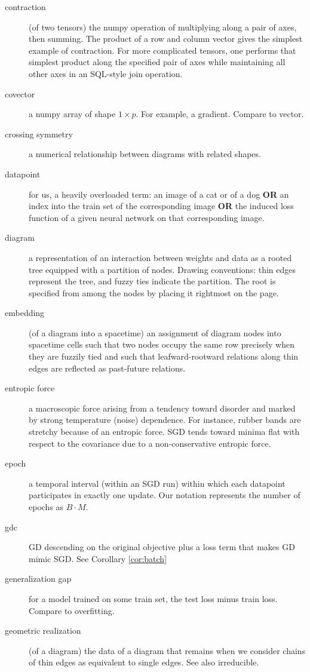 \documentclass{article}
\theoremstyle{plain}
\theoremstyle{definition}
\begin{document}
\begin{description}
        \item[contraction] (of two tensors) the numpy operation of multiplying along a pair of axes, then summing.  The product of a row and column vector gives the simplest example of contraction.  For more complicated tensors, one performs that simplest product along the specified pair of axes while maintaining all other axes in an SQL-style join operation.  
        \item[covector] a numpy array of shape $1\times p$.  For example, a gradient.  Compare to vector.
        \item[crossing symmetry] a numerical relationship between diagrams with related shapes. 
        \item[datapoint] for us, a heavily overloaded term: an image of a cat or of a dog {\bf OR} an index into the train set of the corresponding image {\bf OR} the induced loss function of a given neural network on that corresponding image.  
        \item[diagram] a representation of an interaction between weights and data as a rooted tree equipped with a partition of nodes.  Drawing conventions: thin edges represent the tree, and fuzzy ties indicate the partition.  The root is specified from among the nodes by placing it rightmost on the page.
        \item[embedding] (of a diagram into a spacetime) an assignment of diagram nodes into spacetime cells such that two nodes occupy the same row precisely when they are fuzzily tied and such that leafward-rootward relations along thin edges are reflected as past-future relations.
        \item[entropic force] a macroscopic force arising from a tendency toward disorder and marked by strong temperature (noise) dependence.  For instance, rubber bands are stretchy because of an entropic force.  SGD tends toward minima flat with respect to the covariance due to a non-conservative entropic force.    
        \item[epoch] a temporal interval (within an SGD run) within which each datapoint participates in exactly one update.  Our notation represents the number of epochs as $B\cdot M$.
        \item[gdc] GD descending on the original objective plus a loss term that makes GD mimic SGD.  See Corollary \ref{cor:batch}
        \item[generalization gap] for a model trained on some train set, the test loss minus train loss.  Compare to overfitting.
        \item[geometric realization] (of a diagram) the data of a diagram that remains when we consider chains of thin edges as equivalent to single edges.  See also irreducible.

\end{description}
\end{document}
